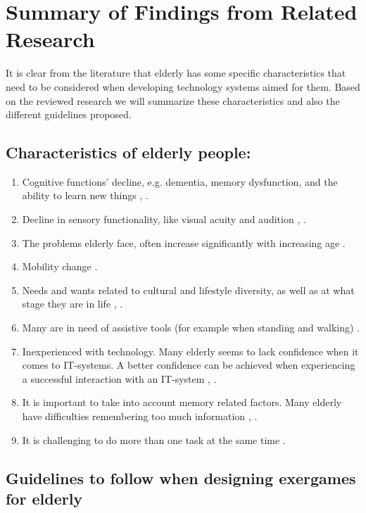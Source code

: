 \section{Summary of Findings from Related Research}
\label{sec:summaryguidelines}
It is clear from the literature that elderly has some specific characteristics that need to be considered when developing technology systems aimed for them. Based on the reviewed research we will summarize these characteristics and also the different guidelines proposed.

\subsection{Characteristics of elderly people:}
\label{subsec:characteristics}
\begin{enumerate}[{c}.1]
\item Cognitive functions' decline, e.g. dementia, memory dysfunction, and the ability to learn new things \cite{Billis}, \cite{gregor}.
\item Decline in sensory functionality, like  visual acuity and audition \cite{Billis}, \cite{gregor}.
\item The problems elderly face, often increase significantly with increasing age \cite{gregor}.
\item Mobility change \cite{Billis}.
\item Needs and wants related to cultural and lifestyle diversity, as well as at what stage they are in life \cite{Billis}, \cite{gregor}.
\item Many are in need of assistive tools (for example when standing and walking) \cite{gregor}.
\item Inexperienced with technology. Many elderly seems to lack confidence when it comes to IT-systems. A better confidence can be achieved when experiencing a successful interaction with an IT-system \cite{Billis}, \cite{gregor}.
\item It is important to take into account memory related factors. Many elderly have difficulties remembering too much information \cite{Billis}, \cite{gregor}.
\item It is challenging to do more than one task at the same time \cite{bruin}.
\end{enumerate}

\subsection{Guidelines to follow when designing exergames for elderly}
\label{subsec:guidelines}

